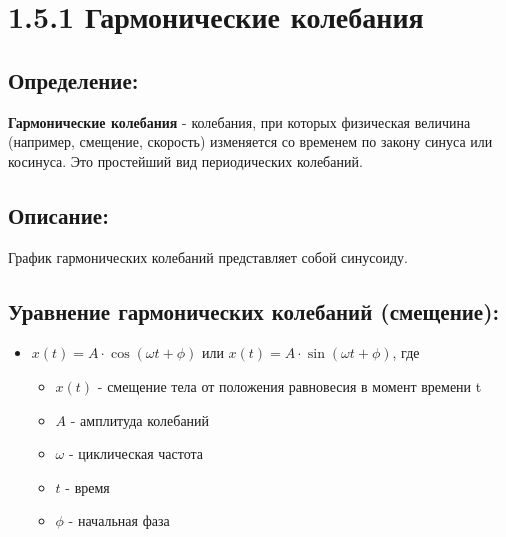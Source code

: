 \documentclass[a4paper,12pt]{article}
\begin{document}
\begin{center}
\end{center}

\vspace{-2.5em}

\section*{1.5.1 Гармонические колебания}

\vspace{-9pt}
\subsection*{Определение:}
\vspace{-3pt}
\textbf{Гармонические колебания} - колебания, при которых физическая величина (например, смещение, скорость) изменяется со временем по закону синуса или косинуса. Это простейший вид периодических колебаний.

\vspace{-9pt}
\subsection*{Описание:}
\vspace{-3pt}
График гармонических колебаний представляет собой синусоиду.

\vspace{-9pt}
\subsection*{Уравнение гармонических колебаний (смещение):}
\vspace{-3pt}
\begin{itemize}[itemsep=0pt, topsep=0pt, parsep=0pt]
    \item $x(t) = A \cdot \cos(\omega t + \phi)$ или $x(t) = A \cdot \sin(\omega t + \phi)$, где
    \begin{itemize}
        \item $x(t)$ - смещение тела от положения равновесия в момент времени t
        \item $A$ - амплитуда колебаний
        \item $\omega$ - циклическая частота
        \item $t$ - время
        \item $\phi$ - начальная фаза
    \end{itemize}
\end{itemize}
\end{document}
